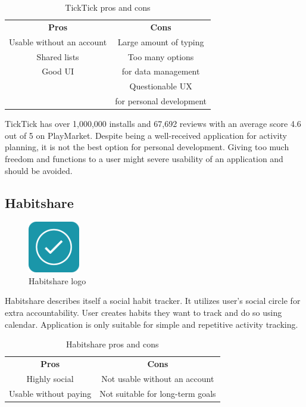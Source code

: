 \begin{table}[h!]
    \centering
    \begin{ctucolortab}
        \begin{tabular}{cc}
            \bfseries Pros & \bfseries Cons\\\Midrule
            Usable without an account & Large amount of typing \\
            Shared lists & Too many options \\
            Good UI & for data management \\
             & Questionable UX \\
             & for personal development \\
        \end{tabular}
    \end{ctucolortab}
    \caption{TickTick pros and cons}\label{tab:ticktick-pros-cons}
\end{table}

TickTick has over 1,000,000 installs and 67,692 reviews with an average score 4.6 out of 5 on PlayMarket.
Despite being a well-received application for activity planning, it is not the best option for personal development.
Giving too much freedom and functions to a user might severe usability of an application and should be avoided.


\subsection{Habitshare}\label{subsec:habitshare}

\begin{figure}[h!]
    \includegraphics[width=0.20\textwidth]{images/habitshare-logo.png}
    \caption{Habitshare logo~\cite{habitshare-logo}}
    \label{fig:habitshare-logo}
\end{figure}

Habitshare describes itself a social habit tracker.
It utilizes user's social circle for extra accountability.
User creates habits they want to track and do so using calendar.
Application is only suitable for simple and repetitive activity tracking.

\begin{table}[h!]
    \centering
    \begin{ctucolortab}
        \begin{tabular}{cc}
            \bfseries Pros & \bfseries Cons\\\Midrule
            Highly social & Not usable without an account\\
            Usable without paying & Not suitable for long-term goals\\
        \end{tabular}
    \end{ctucolortab}
    \caption{Habitshare pros and cons}\label{tab:habitshare-pros-cons}
\end{table}

